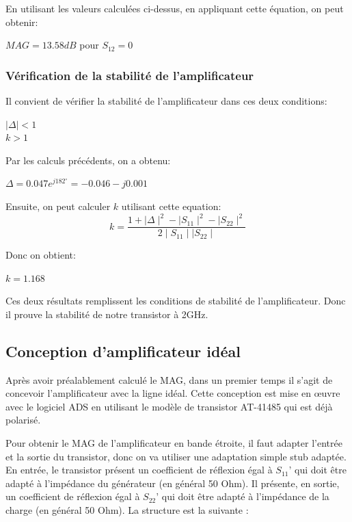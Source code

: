 \documentclass[french]{article}
\begin{document}
En utilisant les valeurs calculées ci-dessus, en appliquant cette équation, on peut obtenir:

{\centering
	$MAG=13.58 dB$ pour $S_{12}=0$\\
}

\subsubsection{Vérification de la stabilité de l’amplificateur}
Il convient de vérifier la stabilité de l’amplificateur dans ces deux conditions:

{\centering
$\mid \Delta\mid<1$\\
$k>1$\\
}

Par les calculs précédents, on a obtenu:

{\centering
$\Delta=0.047e^{j182^{\circ}}=-0.046-j0.001$\\
}

Ensuite, on peut calculer $k$ utilisant cette equation:
\begin{equation}
	k=\frac{1+\mid \Delta\mid^{2}-\mid S_{11}\mid^{2}-\mid S_{22}\mid^{2}}{2\mid S_{11}\mid \mid S_{22}\mid}
\end{equation}

Donc on obtient:

{\centering
	$k=1.168$\\
}

Ces deux résultats remplissent les conditions de stabilité de l'amplificateur. Donc il prouve la stabilité de notre transistor à 2GHz.


\subsection{Conception d’amplificateur idéal}
Après avoir préalablement calculé le MAG, dans un premier temps il s’agit de concevoir l’amplificateur avec la ligne idéal. Cette conception est mise en œuvre avec le logiciel ADS en utilisant le modèle de transistor AT-41485 qui est déjà polarisé.

Pour obtenir le MAG de l’amplificateur en bande étroite, il faut adapter l’entrée et la sortie du transistor, donc on va utiliser une adaptation simple stub adaptée. En entrée, le transistor présent un coefficient de réflexion égal à $S_{11}’$ qui doit être adapté à l’impédance du générateur (en général 50 Ohm). Il présente, en sortie, un coefficient de réflexion égal à $S_{22}’$ qui doit être adapté à l’impédance de la charge (en général 50 Ohm). La structure est la suivante :
\end{document}
